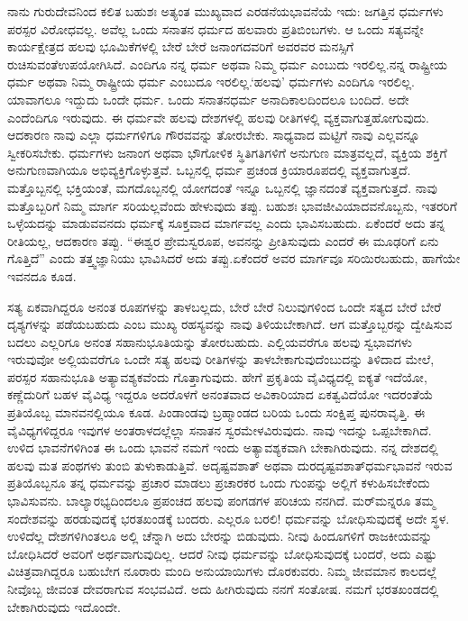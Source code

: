 ನಾನು ಗುರುದೇವನಿಂದ ಕಲಿತ ಬಹುಶಃ ಅತ್ಯಂತ ಮುಖ್ಯವಾದ ಎರಡನೆಯ\break ಭಾವನೆಯೆ ಇದು: ಜಗತ್ತಿನ ಧರ್ಮಗಳು ಪರಸ್ಪರ ವಿರೋಧವಲ್ಲ. ಅವೆಲ್ಲ ಒಂದು ಸನಾತನ ಧರ್ಮದ ಹಲವಾರು ಪ್ರತಿಬಿಂಬಗಳು. ಆ ಒಂದು ಸತ್ಯವನ್ನೇ ಕಾರ್ಯಕ್ಷೇತ್ರದ ಹಲವು ಭೂಮಿಕೆಗಳಲ್ಲಿ ಬೇರೆ ಬೇರೆ ಜನಾಂಗದವರಿಗೆ ಅವರವರ ಮನಸ್ಸಿಗೆ ರುಚಿಸುವಂತೆ\break ಉಪಯೋಗಿಸಿದೆ. ಎಂದಿಗೂ ನನ್ನ ಧರ್ಮ ಅಥವಾ ನಿಮ್ಮ ಧರ್ಮ ಎಂಬುದು ಇರಲಿಲ್ಲ.\break ನನ್ನ ರಾಷ್ಟ್ರೀಯ ಧರ್ಮ ಅಥವಾ ನಿಮ್ಮ ರಾಷ್ಟ್ರೀಯ ಧರ್ಮ ಎಂಬುದೂ ಇರಲಿಲ್ಲ.\break ‘ಹಲವು’ ಧರ್ಮಗಳು ಎಂದಿಗೂ ಇರಲಿಲ್ಲ. ಯಾವಾಗಲೂ ಇದ್ದುದು ಒಂದೇ ಧರ್ಮ. ಒಂದು ಸನಾತನಧರ್ಮ ಅನಾದಿಕಾಲದಿಂದಲೂ ಬಂದಿದೆ. ಅದೇ ಎಂದೆಂದಿಗೂ ಇರುವುದು. ಈ ಧರ್ಮವೇ ಹಲವು ದೇಶಗಳಲ್ಲಿ ಹಲವು ರೀತಿಗಳಲ್ಲಿ ವ್ಯಕ್ತವಾಗುತ್ತ\break ಹೋಗುವುದು. ಆದಕಾರಣ ನಾವು ಎಲ್ಲಾ ಧರ್ಮಗಳಿಗೂ ಗೌರವವನ್ನು ತೋರಬೇಕು. ಸಾಧ್ಯವಾದ ಮಟ್ಟಿಗೆ ನಾವು ಎಲ್ಲವನ್ನೂ ಸ್ವೀಕರಿಸಬೇಕು. ಧರ್ಮಗಳು ಜನಾಂಗ ಅಥವಾ ಭೌಗೋಳಿಕ ಸ್ಥಿತಿಗತಿಗಳಿಗೆ ಅನುಗುಣ ಮಾತ್ರವಲ್ಲದೆ, ವ್ಯಕ್ತಿಯ ಶಕ್ತಿಗೆ ಅನುಗುಣವಾಗಿಯೂ ಅಭಿವ್ಯಕ್ತಿಗೊಳ್ಳುತ್ತವೆ. ಒಬ್ಬನಲ್ಲಿ ಧರ್ಮ ಪ್ರಚಂಡ ಕ್ರಿಯಾರೂಪದಲ್ಲಿ ವ್ಯಕ್ತವಾಗುತ್ತದೆ. ಮತ್ತೊಬ್ಬನಲ್ಲಿ ಭಕ್ತಿಯಂತೆ, ಮಗದೊಬ್ಬನಲ್ಲಿ ಯೋಗದಂತೆ ಇನ್ನೂ ಒಬ್ಬನಲ್ಲಿ ಜ್ಞಾನದಂತೆ ವ್ಯಕ್ತವಾಗುತ್ತದೆ. ನಾವು ಮತ್ತೊಬ್ಬರಿಗೆ ನಿಮ್ಮ ಮಾರ್ಗ ಸರಿಯಲ್ಲವೆಂದು ಹೇಳುವುದು ತಪ್ಪು. ಬಹುಶಃ ಭಾವಜೀವಿಯಾದವನೊಬ್ಬನು, ಇತರರಿಗೆ ಒಳ್ಳೆಯದನ್ನು ಮಾಡುವವನದು ಧರ್ಮಕ್ಕೆ ಸೂಕ್ತವಾದ ಮಾರ್ಗವಲ್ಲ ಎಂದು ಭಾವಿಸಬಹುದು. ಏಕೆಂದರೆ ಅದು ತನ್ನ ರೀತಿಯಲ್ಲ, ಆದಕಾರಣ ತಪ್ಪು. “ಈಶ್ವರ ಪ್ರೇಮಸ್ವರೂಪ, ಅವನನ್ನು ಪ್ರೀತಿಸುವುದು ಎಂದರೆ ಈ ಮೂಢರಿಗೆ ಏನು ಗೊತ್ತಿದೆ” ಎಂದು ತತ್ತ್ವಜ್ಞಾನಿಯು ಭಾವಿಸಿದರೆ ಅದು ತಪ್ಪು.\break ಏಕೆಂದರೆ ಅವರ ಮಾರ್ಗವೂ ಸರಿಯಿರಬಹುದು, ಹಾಗೆಯೇ ಇವನದೂ ಕೂಡ.

ಸತ್ಯ ಏಕವಾಗಿದ್ದರೂ ಅನಂತ ರೂಪಗಳನ್ನು ತಾಳಬಲ್ಲದು, ಬೇರೆ ಬೇರೆ ನಿಲುವುಗಳಿಂದ ಒಂದೇ ಸತ್ಯದ ಬೇರೆ ಬೇರೆ ದೃಶ್ಯಗಳನ್ನು ಪಡೆಯಬಹುದು ಎಂಬ ಮುಖ್ಯ ರಹಸ್ಯವನ್ನು ನಾವು ತಿಳಿಯಬೇಕಾಗಿದೆ. ಆಗ ಮತ್ತೊಬ್ಬರನ್ನು ದ್ವೇಷಿಸುವ ಬದಲು ಎಲ್ಲರಿಗೂ ಅನಂತ ಸಹಾನುಭೂತಿಯನ್ನು ತೋರಬಹುದು. ಎಲ್ಲಿಯವರೆಗೂ ಹಲವು ಸ್ವಭಾವಗಳು ಇರುವುವೋ ಅಲ್ಲಿಯವರೆಗೂ ಒಂದೇ ಸತ್ಯ ಹಲವು ರೀತಿಗಳನ್ನು ತಾಳಬೇಕಾಗುವುದೆಂಬುದನ್ನು ತಿಳಿದಾದ ಮೇಲೆ, ಪರಸ್ಪರ ಸಹಾನುಭೂತಿ ಅತ್ಯಾವಶ್ಯಕವೆಂದು ಗೊತ್ತಾಗುವುದು. ಹೇಗೆ ಪ್ರಕೃತಿಯ ವೈವಿಧ್ಯದಲ್ಲಿ ಐಕ್ಯತೆ ಇದೆಯೋ, ಕಣ್ಣೆದುರಿಗೆ ಬಹಳ ವೈವಿಧ್ಯ ಇದ್ದರೂ ಅದರೊಳಗೆ ಅನಂತವಾದ ಅವಿಕಾರಿಯಾದ ಏಕತ್ವವಿದೆಯೋ ಇದರಂತೆಯೆ ಪ್ರತಿಯೊಬ್ಬ ಮಾನವನಲ್ಲಿಯೂ ಕೂಡ. ಪಿಂಡಾಂಡವು ಬ್ರಹ್ಮಾಂಡದ ಬರಿಯ ಒಂದು ಸಂಕ್ಷಿಪ್ತ ಪುನರಾವೃತ್ತಿ. ಈ ವೈವಿಧ್ಯಗಳಿದ್ದರೂ ಇವುಗಳ ಅಂತರಾಳದಲ್ಲೆಲ್ಲಾ ಸನಾತನ ಸ್ವರಮೇಳವಿರುವುದು. ನಾವು ಇದನ್ನು ಒಪ್ಪಬೇಕಾಗಿದೆ. ಉಳಿದ ಭಾವನೆಗಳಿಗಿಂತ ಈ ಒಂದು ಭಾವನೆ ನಮಗೆ ಇಂದು ಅತ್ಯಾವಶ್ಯಕವಾಗಿ ಬೇಕಾಗಿರುವುದು. ನನ್ನ ದೇಶದಲ್ಲಿ ಹಲವು ಮತ ಪಂಥಗಳು ತುಂಬಿ ತುಳುಕಾಡುತ್ತಿವೆ. ಅದೃಷ್ಟವಶಾತ್​ ಅಥವಾ ದುರದೃಷ್ಟವಶಾತ್​ ಧರ್ಮಭಾವನೆ ಇರುವ ಪ್ರತಿಯೊಬ್ಬನೂ ತನ್ನ ಧರ್ಮವನ್ನು ಪ್ರಚಾರ ಮಾಡಲು ಪ್ರಚಾರಕರ ಒಂದು ಗುಂಪನ್ನು ಅಲ್ಲಿಗೆ ಕಳುಹಿಸಬೇಕೆಂದು ಭಾವಿಸುವನು. ಬಾಲ್ಯಾರಭ್ಯದಿಂದಲೂ ಪ್ರಪಂಚದ ಹಲವು ಪಂಗಡಗಳ ಪರಿಚಯ ನನಗಿದೆ. ಮರ್​ಮನ್ನರೂ ತಮ್ಮ ಸಂದೇಶವನ್ನು ಹರಡುವುದಕ್ಕೆ ಭರತಖಂಡಕ್ಕೆ ಬಂದರು. ಎಲ್ಲರೂ ಬರಲಿ! ಧರ್ಮವನ್ನು ಬೋಧಿಸುವುದಕ್ಕೆ ಅದೇ ಸ್ಥಳ. ಉಳಿದೆಲ್ಲ ದೇಶಗಳಿಗಿಂತಲೂ ಅಲ್ಲಿ ಚೆನ್ನಾಗಿ ಅದು ಬೇರನ್ನು ಬಿಡುವುದು. ನೀವು ಹಿಂದೂಗಳಿಗೆ ರಾಜಕೀಯವನ್ನು ಬೋಧಿಸಿದರೆ ಅವರಿಗೆ ಅರ್ಥವಾಗುವುದಿಲ್ಲ. ಆದರೆ ನೀವು ಧರ್ಮವನ್ನು ಬೋಧಿಸುವುದಕ್ಕೆ ಬಂದರೆ, ಅದು ಎಷ್ಟು ವಿಚಿತ್ರವಾಗಿದ್ದರೂ ಬಹುಬೇಗ ನೂರಾರು ಮಂದಿ ಅನುಯಾಯಿಗಳು ದೊರಕುವರು. ನಿಮ್ಮ ಜೀವಮಾನ ಕಾಲದಲ್ಲೆ ನೀವೊಬ್ಬ ಜೀವಂತ ದೇವರಾಗುವ ಸಂಭವವಿದೆ. ಅದು ಹೀಗಿರುವುದು ನನಗೆ ಸಂತೋಷ. ನಮಗೆ ಭರತಖಂಡದಲ್ಲಿ ಬೇಕಾಗಿರುವುದು ಇದೊಂದೇ.

